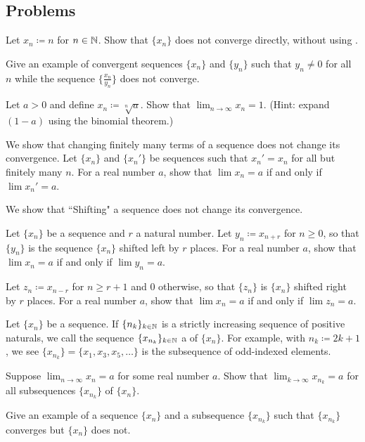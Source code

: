 \documentclass[../notes.tex]{subfiles}
\begin{document}
\subsection{Problems}
\begin{homework}
    Let $x_n\coloneqq n$ for $n\in \mathbb N$. Show that $\{x_n\}$ does not converge directly, without using . 
\end{homework}
\begin{homework}
    Give an example of convergent sequences $\{x_n\}$ and $\{y_n\}$ such that $y_n\neq 0$ for all $n$ while the sequence $\big\{ \frac{x_n}{y_n} \big\}$ does not converge.
\end{homework}
\begin{homework}
    Let $a>0$ and define $x_n\coloneqq\sqrt[n]{a}$. Show that $\lim_{n\to \infty}x_n = 1$. (Hint: expand $(1-a)$ using the binomial theorem.) 
\end{homework}
\begin{homework}
    We show that changing finitely many terms of a sequence does not change its convergence. Let $\{x_n\}$ and $\{x_n'\}$ be sequences such that $x_n' = x_n$ for all but finitely many $n$. For a real number $a$, show that $\lim x_n = a$ if and only if $\lim x_n'=a$.
\end{homework}
\begin{homework}
    We show that ``Shifting" a sequence does not change its convergence.
    \begin{listalph}
        \item Let $\{x_n\}$ be a sequence and $r$ a natural number. Let $y_n \coloneqq x_{n+r}$ for $n\geq 0$, so that $\{y_n\}$ is the sequence $\{x_n\}$ shifted left by $r$ places. For a real number $a$, show that $\lim x_n=a$ if and only if $\lim y_n=a$.
        \item  Let $z_n\coloneqq x_{n-r}$ for $n\geq r+1$ and $0$ otherwise, so that $\{z_n\}$ is $\{x_n\}$ shifted right by $r$ places. For a real number $a$, show that $\lim x_n=a$ if and only if $\lim z_n=a$.
    \end{listalph}
\end{homework}
\begin{homework}
    Let $\{x_n\}$ be a sequence. If $\{n_k\}_{k\in\mathbb N}$ is a strictly increasing sequence of positive naturals, we call the sequence $\{x_{n_k}\}_{k\in \mathbb N}$ a  of $\{x_n\}$. For example, with $n_k \coloneqq 2k+1$, we see $\{x_{n_k}\}=\{x_1, x_3, x_5, \dots\}$ is the subsequence of odd-indexed elements. 
    \begin{listalph}
        \item Suppose $\lim_{n\to \infty} x_n =a$ for some real number $a$. Show that $\lim_{k\to\infty}x_{n_k}=a$ for all subsequences $\{x_{n_k}\}$ of $\{x_n\}$. 
        \item Give an example of a sequence $\{x_n\}$ and a subsequence $\{x_{n_k}\}$ such that $\{x_{n_k}\}$ converges but $\{x_n\}$ does not.
    \end{listalph}
\end{homework}
\end{document}
